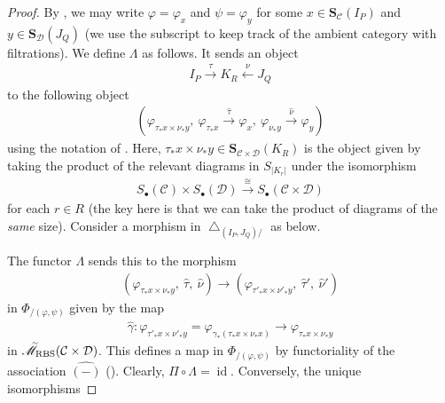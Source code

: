 \documentclass[12pt, reqno]{amsart}
\theoremstyle{plain}
\theoremstyle{definition}
\renewcommand{\phi}{\varphi}
\begin{document}
\begin{proof}
By , we may write $\phi=\phi_x$ and $\psi=\phi_y$ for some $x\in \mathbf{S}_{\mathcal{C}}(I_P)$ and $y\in \mathbf{S}_{\mathcal{D}}(J_Q)$ (we use the subscript to keep track of the ambient category with filtrations). We define $\Lambda$ as follows. It sends an object
\begin{align*}
I_P\xrightarrow{\tau} K_R\xleftarrow{\nu} J_Q
\end{align*}
to the following object
\begin{align*}
(\phi_{\tau_*x\times \nu_*y},\  
\phi_{\tau_*x}\xrightarrow{\hat{\tau}}\phi_x,\ \phi_{\nu_*y}\xrightarrow{\hat{\nu}}\phi_y)
\end{align*}
using the notation of . Here, $\tau_*x\times \nu_*y\in \mathbf{S}_{\mathcal{C}\times \mathcal{D}}(K_R)$ is the object given by taking the product of the relevant diagrams in $S_{|K_r|}$ under the isomorphism
\begin{align*}
S_\bullet(\mathcal{C})\times S_\bullet(\mathcal{D})\xrightarrow{\cong} S_\bullet(\mathcal{C}\times \mathcal{D})
\end{align*}
for each $r\in R$ (the key here is that we can take the product of diagrams of the \textit{same} size). Consider a morphism in $\bigtriangleup_{(I_P,J_Q)/}$ as below.
\begin{center}
\end{center}
The functor $\Lambda$ sends this to the morphism
\begin{align*}
(\phi_{\tau_*x\times \nu_*y},\  
\hat{\tau},\ \hat{\nu})\longrightarrow (\phi_{\tau'_*x\times \nu'_*y},\  
\hat{\tau}',\ \hat{\nu}')
\end{align*}
in $\Phi_{/(\phi,\psi)}$ given by the map
\begin{align*}
\hat{\gamma}\colon \phi_{\tau'_*x\times \nu'_*y}=\phi_{\gamma_*(\tau_*x\times \nu_*x)}\longrightarrow\phi_{\tau_*x\times \nu_*y}
\end{align*}
in $\accentset{\sim}{\mathscr{M}}_{\operatorname{RBS}}(\mathcal{C}\times \mathcal{D})$. This defines a map in $\Phi_{/(\phi,\psi)}$ by functoriality of the association $\hat{\scriptstyle(-)}$ (). Clearly, $\Pi\circ \Lambda=\operatorname{id}$. Conversely, the unique isomorphisms

\end{proof}
\end{document}
